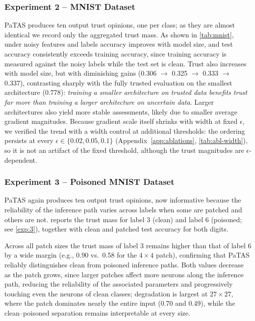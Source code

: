 \subsubsection*{Experiment 2 -- MNIST Dataset}
PaTAS produces ten output trust opinions, one per class; as they are almost identical we record only the aggregated trust mass. As shown in \cref{tab:mnist}, under noisy features and labels accuracy improves with model size, and test accuracy consistently exceeds training accuracy, since training accuracy is measured against the noisy labels while the test set is clean. Trust also increases with model size, but with diminishing gains (0.306 $\to$ 0.325 $\to$ 0.333 $\to$ 0.337), contrasting sharply with the fully trusted evaluation on the smallest architecture (0.778): \emph{training a smaller architecture on trusted data benefits trust far more than training a larger architecture on uncertain data}. Larger architectures also yield more stable assessments, likely due to smaller average gradient magnitudes. Because gradient scale itself shrinks with width at fixed $\epsilon$, we verified the trend with a width control at additional thresholds: the ordering persists at every $\epsilon \in \{0.02, 0.05, 0.1\}$ (Appendix~\ref{app:ablations}, \cref{tab:abl-width}), so it is not an artifact of the fixed threshold, although the trust magnitudes are $\epsilon$-dependent.


\subsubsection*{Experiment 3 – Poisoned MNIST Dataset}
PaTAS again produces ten output trust opinions, now informative because the reliability of the inference path varies across labels when some are patched and others are not.  reports the trust mass for label 3 (clean) and label 6 (poisoned; see \cref{exp:3}), together with clean and patched test accuracy for both digits.

Across all patch sizes the trust mass of label 3 remains higher than that of label 6 by a wide margin (e.g., 0.90 vs.\ 0.58 for the $4\times4$ patch), confirming that PaTAS reliably distinguishes clean from poisoned inference paths. Both values decrease as the patch grows, since larger patches affect more neurons along the inference path, reducing the reliability of the associated parameters and progressively touching even the neurons of clean classes; degradation is largest at $27 \times 27$, where the patch dominates nearly the entire input (0.70 and 0.49), while the clean--poisoned separation remains interpretable at every size.

